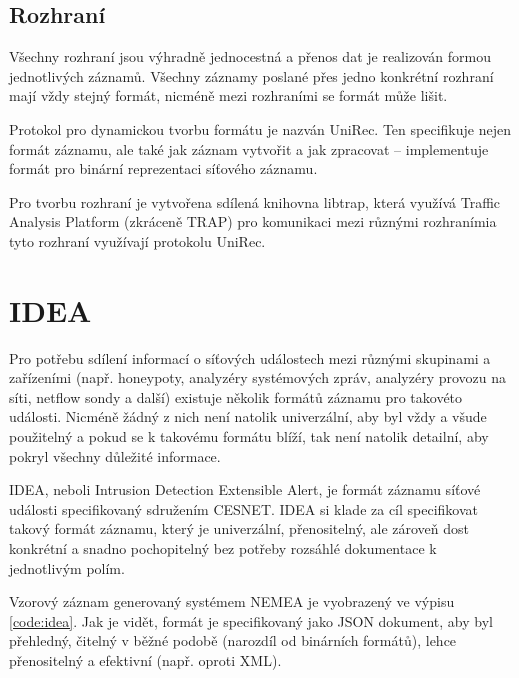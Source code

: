 \subsection{Rozhraní}

Všechny rozhraní jsou výhradně jednocestná a přenos dat je realizován formou jednotlivých záznamů. Všechny záznamy poslané přes jedno konkrétní rozhraní mají vždy stejný formát, nicméně mezi rozhraními se formát může lišit. 

Protokol pro dynamickou tvorbu formátu je nazván UniRec. Ten specifikuje nejen formát záznamu, ale také jak záznam vytvořit a jak zpracovat -- implementuje formát pro binární reprezentaci síťového záznamu.

Pro tvorbu rozhraní je vytvořena sdílená knihovna libtrap, která využívá Traffic Analysis Platform (zkráceně TRAP) pro komunikaci mezi různými rozhranímia tyto rozhraní využívají protokolu UniRec.

\section{IDEA}
\label{sec:idea}

Pro potřebu sdílení informací o síťových událostech mezi různými skupinami a zařízeními (např. honeypoty, analyzéry systémových zpráv, analyzéry provozu na síti, netflow sondy a další) existuje několik formátů záznamu pro takovéto události. Nicméně žádný z nich není natolik univerzální, aby byl vždy a všude použitelný a pokud se k takovému formátu blíží, tak není natolik detailní, aby pokryl všechny důležité informace.

IDEA, neboli Intrusion Detection Extensible Alert, je formát záznamu síťové události specifikovaný sdružením CESNET. IDEA si klade za cíl specifikovat takový formát záznamu, který je univerzální, přenositelný, ale zároveň dost konkrétní a snadno pochopitelný bez potřeby rozsáhlé dokumentace k jednotlivým polím.

Vzorový záznam generovaný systémem NEMEA je vyobrazený ve výpisu \ref{code:idea}. Jak je vidět, formát je specifikovaný jako JSON dokument, aby byl přehledný, čitelný v běžné podobě (narozdíl od binárních formátů), lehce přenositelný a efektivní (např. oproti XML\cite{xmlvsjson}).

